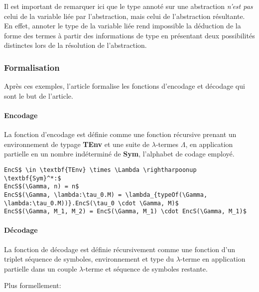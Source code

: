 \documentclass[titlepage]{article}
\let\oldparagraph\paragraph
\renewcommand{\paragraph}[1]{\oldparagraph{#1}\mbox{}}
\begin{document}
Il est important de remarquer ici que le type annoté sur une abstraction \emph{n'est pas} celui de la variable
liée par l'abstraction, mais celui de l'abstraction résultante. En effet, annoter le type de la variable liée
rend impossible la déduction de la forme des termes à partir des informations de type en présentant deux possibilités
distinctes lors de la résolution de l'abstraction.

\subsubsection{Formalisation}\label{formalisation}

Après ces exemples, l'article formalise les fonctions d'encodage et
décodage qui sont le but de l'article.

\paragraph{Encodage}\label{encodage}

La fonction d'encodage est définie comme une fonction récursive prenant
un environnement de typage \textbf{TEnv} et une suite de
\(\lambda\)-termes \(\Lambda\), en application partielle en un nombre
indéterminé de \textbf{Sym}, l'alphabet de codage employé.

\begin{lstlisting}
EncS$ \in \textbf{TEnv} \times \Lambda \rightharpoonup \textbf{Sym}^*:$
EncS$(\Gamma, n) = n$
EncS$(\Gamma, \lambda:\tau_0.M) = \lambda_{typeOf(\Gamma, \lambda:\tau_0.M))}.EncS(\tau_0 \cdot \Gamma, M)$
EncS$(\Gamma, M_1, M_2) = EncS(\Gamma, M_1) \cdot EncS(\Gamma, M_1)$
\end{lstlisting}

\paragraph{Décodage}\label{duxe9codage}

La fonction de décodage est définie récursivement comme une fonction d'un triplet séquence de symboles,
environnement et type du $\lambda$-terme en application partielle dans un couple $\lambda$-terme et séquence
de symboles restante.

Plus formellement:
\end{document}

